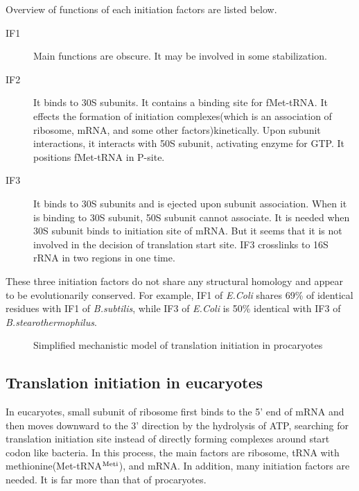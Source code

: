 Overview of functions of each initiation factors are listed below.
\begin{description}

\item[IF1] Main functions are obscure. 
It may be involved in some stabilization.

\item[IF2] It binds to 30S subunits. It contains a binding site for fMet-tRNA.
      It effects the formation of initiation complexes(which is an association
of  ribosome, mRNA, and some other factors)kinetically. Upon subunit 
interactions, it interacts with 50S subunit, activating enzyme for GTP.
It positions fMet-tRNA in P-site.

\item[IF3] It binds to 30S subunits and is ejected upon subunit association.
  When it is binding to 30S subunit, 50S subunit cannot associate. It is
  needed when 30S subunit binds to initiation site of mRNA. But it seems that
  it is not involved in the decision of translation start site.
  IF3 crosslinks to 16S rRNA in two regions in one time.\\

\end{description}
These three initiation factors do not share any structural homology
and appear to be evolutionarily conserved. For example, IF1 of {\it E.Coli}
shares 69\% of identical residues with IF1 of {\it B.subtilis}, while IF3
of {\it E.Coli} is 50\% identical with IF3 of {\it B.stearothermophilus}.

\begin{figure}
\begin{center}
\end{center}
\caption{Simplified mechanistic model of translation initiation in
procaryotes}
\end{figure}



\subsection{Translation initiation in eucaryotes}
In eucaryotes, small subunit of ribosome first binds to the 5' end of
mRNA and then moves downward to the 3' direction by the hydrolysis of 
ATP, searching
for translation initiation site instead of
directly forming complexes around start codon like bacteria. 
In this process, the main factors are ribosome, tRNA with 
methionine(Met-tRNA$^{\rm Meti}$), and mRNA. In addition, many initiation factors 
are needed. It is far more than that of procaryotes.

